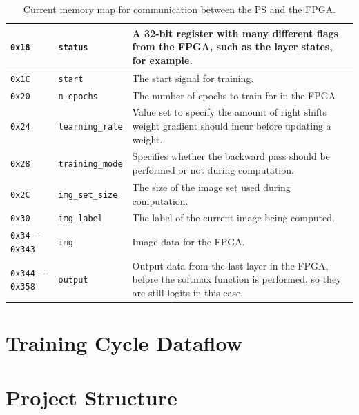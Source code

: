 \begin{table}
\begin{tabularx}{\textwidth}{|l| l| X|}
		\texttt{0x18} &
		\texttt{status} &
		A 32-bit register with many different flags from the FPGA, such as the layer states, for example. \\\hline 
		
		\texttt{0x1C} &
		\texttt{start} &
		The start signal for training. \\\hline 
		
		\texttt{0x20} &
		\texttt{n\_epochs} &
		The number of epochs to train for in the FPGA \\\hline 
		
		\texttt{0x24} &
		\texttt{learning\_rate} &
		Value set to specify the amount of right shifts weight gradient should incur before updating a weight. \\\hline 
		
		\texttt{0x28} &
		\texttt{training\_mode} &
		Specifies whether the backward pass should be performed or not during computation.\\\hline
		
		\texttt{0x2C} &
		\texttt{img\_set\_size} &
		The size of the image set used during computation. \\\hline 
		
		\texttt{0x30} &
		\texttt{img\_label} &
		The label of the current image being computed. \\\hline 
		
		\texttt{0x34 -- 0x343} &
		\texttt{img} &
		Image data for the FPGA. \\\hline
		
		\texttt{0x344 -- 0x358} &
		\texttt{output} &
		Output data from the last layer in the FPGA, before the softmax function is performed, so they are still logits in this case.\\\hline		
	\end{tabularx}	
	\caption{Current memory map for communication between the PS and the FPGA.}
	\label{tbl:mmio}
\end{table}


\section{Training Cycle Dataflow}

\section{Project Structure}


